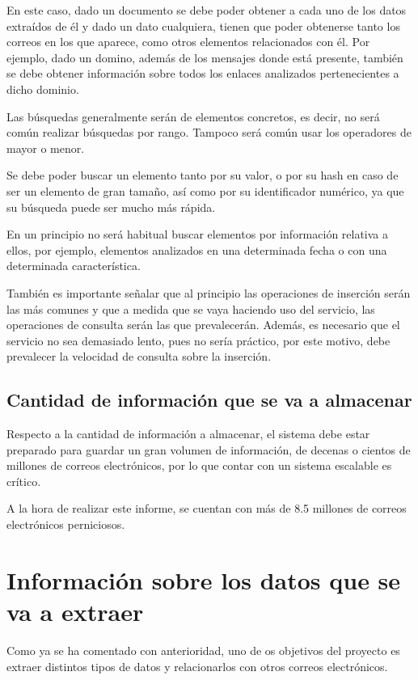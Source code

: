En este caso, dado un documento se debe poder obtener a cada uno de los datos extraídos de él y dado un dato cualquiera, tienen que poder obtenerse tanto los correos en los que aparece, como otros elementos relacionados con él. Por ejemplo, dado un domino, además de los mensajes donde está presente, también se debe obtener información sobre todos los enlaces analizados pertenecientes a dicho dominio.

Las búsquedas generalmente serán de elementos concretos, es decir, no será común realizar búsquedas por rango. Tampoco será común usar los operadores de mayor o menor.

Se debe poder buscar un elemento tanto por su valor, o por su hash en caso de ser un elemento de gran tamaño, así como por su identificador numérico, ya que su búsqueda puede ser mucho más rápida. 

En un principio no será habitual buscar elementos por información relativa a ellos, por ejemplo, elementos analizados en una determinada fecha o con una determinada característica. 

También es importante señalar que al principio las operaciones de inserción serán las más comunes y que a medida que se vaya haciendo uso del servicio, las operaciones de consulta serán las que prevalecerán. Además, es necesario que el servicio no sea demasiado lento, pues no sería práctico, por este motivo, debe prevalecer la velocidad de consulta sobre la inserción. 

\subsection{Cantidad de información que se va a almacenar}
Respecto a la cantidad de información a almacenar, el sistema debe estar preparado para guardar un gran volumen de información, de decenas o cientos de millones de correos electrónicos, por lo que contar con un sistema escalable es crítico.  

A la hora de realizar este informe, se cuentan con más de 8.5 millones de correos electrónicos perniciosos. 


\section{Información sobre los datos que se va a extraer}
Como ya se ha comentado con anterioridad, uno de os objetivos del proyecto es extraer distintos tipos de datos y relacionarlos con otros correos electrónicos. 

